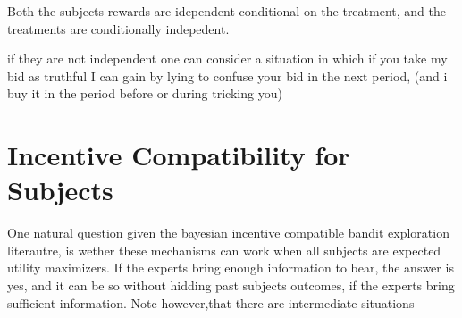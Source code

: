 Both the subjects rewards are idependent conditional on the treatment, and the treatments are conditionally indepedent.

if they are not independent one can consider a situation in which if you take my bid as truthful I can gain by lying to confuse your bid in the next period, (and i buy it in the period before or during tricking you)




\section{Incentive Compatibility for Subjects}

One natural question given the bayesian incentive compatible bandit exploration literautre, is wether these mechanisms can work when all subjects are expected utility maximizers. If the experts bring enough information to bear, the answer is yes, and it can be so without hidding past subjects outcomes, if the experts bring sufficient information. Note however,that there are intermediate situations 

